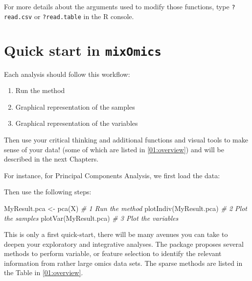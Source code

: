 \documentclass[
]{book}
\newenvironment{Shaded}{\begin{snugshade}}{\end{snugshade}}
\newcommand{\CommentTok}[1]{\textcolor[rgb]{0.56,0.35,0.01}{\textit{#1}}}
\newcommand{\FunctionTok}[1]{\textcolor[rgb]{0.00,0.00,0.00}{#1}}
\newcommand{\NormalTok}[1]{#1}
\newcommand{\OtherTok}[1]{\textcolor[rgb]{0.56,0.35,0.01}{#1}}
\newcommand{\SpecialCharTok}[1]{\textcolor[rgb]{0.00,0.00,0.00}{#1}}
\providecommand{\tightlist}{%
  \setlength{\itemsep}{0pt}\setlength{\parskip}{0pt}}
\begin{document}
For more details about the arguments used to modify those functions, type \texttt{?read.csv} or \texttt{?read.table} in the R console.

\hypertarget{02:quick-start}{%
\section{\texorpdfstring{Quick start in \texttt{mixOmics}}{Quick start in mixOmics}}\label{02:quick-start}}

Each analysis should follow this workflow:

\begin{enumerate}
\def\labelenumi{\arabic{enumi}.}
\tightlist
\item
  Run the method
\item
  Graphical representation of the samples
\item
  Graphical representation of the variables
\end{enumerate}

Then use your critical thinking and additional functions and visual tools to make sense of your data! (some of which are listed in \ref{01:overview}) and will be described in the next Chapters.

For instance, for Principal Components Analysis, we first load the data:

\begin{Shaded}
\end{Shaded}

Then use the following steps:

\begin{Shaded}
\begin{Highlighting}[]
\NormalTok{MyResult.pca }\OtherTok{\textless{}{-}} \FunctionTok{pca}\NormalTok{(X)  }\CommentTok{\# 1 Run the method}
\FunctionTok{plotIndiv}\NormalTok{(MyResult.pca) }\CommentTok{\# 2 Plot the samples}
\FunctionTok{plotVar}\NormalTok{(MyResult.pca)   }\CommentTok{\# 3 Plot the variables}
\end{Highlighting}
\end{Shaded}

This is only a first quick-start, there will be many avenues you can take to deepen your exploratory and integrative analyses. The package proposes several methods to perform variable, or feature selection to identify the relevant information from rather large omics data sets. The sparse methods are listed in the Table in \ref{01:overview}.
\end{document}
